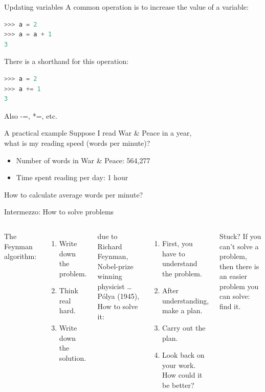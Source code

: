 \documentclass[aspectratio=169,usenames,dvipsnames]{beamer}
\begin{document}
\begin{frame}[fragile]{Updating variables}
A common operation is to increase the value of a variable:
\begin{lstlisting}[language=python]
>>> a = 2
>>> a = a + 1
3
\end{lstlisting}

\pause
There is a shorthand for this operation:
\begin{lstlisting}[language=python]
>>> a = 2
>>> a += 1
3
\end{lstlisting}

Also -=, *=, etc.
\end{frame}


\begin{frame}{A practical example}
    Suppose I read War \& Peace in a year, \\
    what is my reading speed (words per minute)?
    \begin{itemize}
        \item Number of words in War \& Peace: 564,277
        \item Time spent reading per day: 1 hour
    \end{itemize}
    How to calculate average words per minute?
\end{frame}

\begin{frame}{Intermezzo: How to solve problems}
	\begin{columns}
			The Feynman algorithm:
			\begin{enumerate}
				\item Write down the problem.
				\item Think real hard.
				\item Write down the solution.
			\end{enumerate}

			\vspace{1em}
			due to Richard Feynman, Nobel-prize winning physicist \dots
		\pause
			Pólya (1945), How to solve it:

			\begin{enumerate}
				\item First, you have to understand the problem.
				\item After understanding, make a plan.
				\item Carry out the plan.
				\item Look back on your work. How could it be better?
			\end{enumerate}

			\begin{block}{Stuck?}
			If you can't solve a problem,
			then there is an easier problem you can solve:
			find it.
			\end{block}
	\end{columns}
\end{frame}
\end{document}
